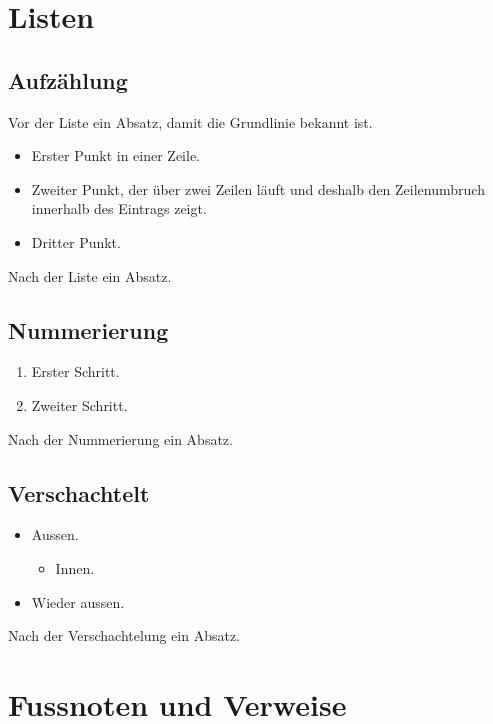 \documentclass{swisstex}
\begin{document}

\section{Listen}

\subsection{Aufzählung}

Vor der Liste ein Absatz, damit die Grundlinie bekannt ist.

\begin{itemize}
\item Erster Punkt in einer Zeile.
\item Zweiter Punkt, der über zwei Zeilen läuft und deshalb den
      Zeilenumbruch innerhalb des Eintrags zeigt.
\item Dritter Punkt.
\end{itemize}

Nach der Liste ein Absatz.

\subsection{Nummerierung}

\begin{enumerate}
\item Erster Schritt.
\item Zweiter Schritt.
\end{enumerate}

Nach der Nummerierung ein Absatz.

\subsection{Verschachtelt}

\begin{itemize}
\item Aussen.
  \begin{itemize}
  \item Innen.
  \end{itemize}
\item Wieder aussen.
\end{itemize}

Nach der Verschachtelung ein Absatz.

\section{Fussnoten und Verweise}
\end{document}
